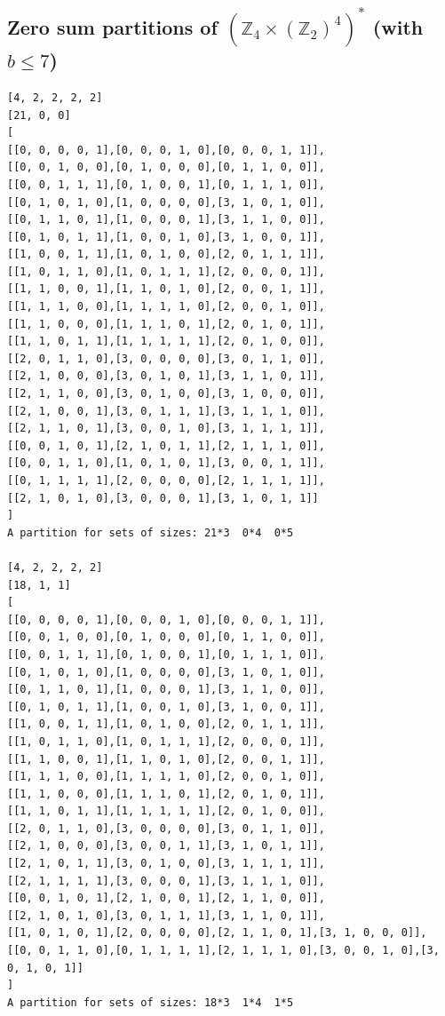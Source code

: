 \documentclass[final]{dmtcs-episciences}
\newcommand{\zet}{\mathbb{Z}}
\begin{document}
\begin{appendices}
\newpage
\section{\texorpdfstring{Zero sum partitions of $\left(\zet_4\times(\zet_2)^{4}\right)^*$ (with $b\leq 7$)}{Zero sum partitions of (Z4 x (Z2)**4)* (with b <= 7)}}\label{a:42222}

\begin{verbatim}
[4, 2, 2, 2, 2]
[21, 0, 0]
[
[[0, 0, 0, 0, 1],[0, 0, 0, 1, 0],[0, 0, 0, 1, 1]],
[[0, 0, 1, 0, 0],[0, 1, 0, 0, 0],[0, 1, 1, 0, 0]],
[[0, 0, 1, 1, 1],[0, 1, 0, 0, 1],[0, 1, 1, 1, 0]],
[[0, 1, 0, 1, 0],[1, 0, 0, 0, 0],[3, 1, 0, 1, 0]],
[[0, 1, 1, 0, 1],[1, 0, 0, 0, 1],[3, 1, 1, 0, 0]],
[[0, 1, 0, 1, 1],[1, 0, 0, 1, 0],[3, 1, 0, 0, 1]],
[[1, 0, 0, 1, 1],[1, 0, 1, 0, 0],[2, 0, 1, 1, 1]],
[[1, 0, 1, 1, 0],[1, 0, 1, 1, 1],[2, 0, 0, 0, 1]],
[[1, 1, 0, 0, 1],[1, 1, 0, 1, 0],[2, 0, 0, 1, 1]],
[[1, 1, 1, 0, 0],[1, 1, 1, 1, 0],[2, 0, 0, 1, 0]],
[[1, 1, 0, 0, 0],[1, 1, 1, 0, 1],[2, 0, 1, 0, 1]],
[[1, 1, 0, 1, 1],[1, 1, 1, 1, 1],[2, 0, 1, 0, 0]],
[[2, 0, 1, 1, 0],[3, 0, 0, 0, 0],[3, 0, 1, 1, 0]],
[[2, 1, 0, 0, 0],[3, 0, 1, 0, 1],[3, 1, 1, 0, 1]],
[[2, 1, 1, 0, 0],[3, 0, 1, 0, 0],[3, 1, 0, 0, 0]],
[[2, 1, 0, 0, 1],[3, 0, 1, 1, 1],[3, 1, 1, 1, 0]],
[[2, 1, 1, 0, 1],[3, 0, 0, 1, 0],[3, 1, 1, 1, 1]],
[[0, 0, 1, 0, 1],[2, 1, 0, 1, 1],[2, 1, 1, 1, 0]],
[[0, 0, 1, 1, 0],[1, 0, 1, 0, 1],[3, 0, 0, 1, 1]],
[[0, 1, 1, 1, 1],[2, 0, 0, 0, 0],[2, 1, 1, 1, 1]],
[[2, 1, 0, 1, 0],[3, 0, 0, 0, 1],[3, 1, 0, 1, 1]]
]
A partition for sets of sizes: 21*3  0*4  0*5

[4, 2, 2, 2, 2]
[18, 1, 1]
[
[[0, 0, 0, 0, 1],[0, 0, 0, 1, 0],[0, 0, 0, 1, 1]],
[[0, 0, 1, 0, 0],[0, 1, 0, 0, 0],[0, 1, 1, 0, 0]],
[[0, 0, 1, 1, 1],[0, 1, 0, 0, 1],[0, 1, 1, 1, 0]],
[[0, 1, 0, 1, 0],[1, 0, 0, 0, 0],[3, 1, 0, 1, 0]],
[[0, 1, 1, 0, 1],[1, 0, 0, 0, 1],[3, 1, 1, 0, 0]],
[[0, 1, 0, 1, 1],[1, 0, 0, 1, 0],[3, 1, 0, 0, 1]],
[[1, 0, 0, 1, 1],[1, 0, 1, 0, 0],[2, 0, 1, 1, 1]],
[[1, 0, 1, 1, 0],[1, 0, 1, 1, 1],[2, 0, 0, 0, 1]],
[[1, 1, 0, 0, 1],[1, 1, 0, 1, 0],[2, 0, 0, 1, 1]],
[[1, 1, 1, 0, 0],[1, 1, 1, 1, 0],[2, 0, 0, 1, 0]],
[[1, 1, 0, 0, 0],[1, 1, 1, 0, 1],[2, 0, 1, 0, 1]],
[[1, 1, 0, 1, 1],[1, 1, 1, 1, 1],[2, 0, 1, 0, 0]],
[[2, 0, 1, 1, 0],[3, 0, 0, 0, 0],[3, 0, 1, 1, 0]],
[[2, 1, 0, 0, 0],[3, 0, 0, 1, 1],[3, 1, 0, 1, 1]],
[[2, 1, 0, 1, 1],[3, 0, 1, 0, 0],[3, 1, 1, 1, 1]],
[[2, 1, 1, 1, 1],[3, 0, 0, 0, 1],[3, 1, 1, 1, 0]],
[[0, 0, 1, 0, 1],[2, 1, 0, 0, 1],[2, 1, 1, 0, 0]],
[[2, 1, 0, 1, 0],[3, 0, 1, 1, 1],[3, 1, 1, 0, 1]],
[[1, 0, 1, 0, 1],[2, 0, 0, 0, 0],[2, 1, 1, 0, 1],[3, 1, 0, 0, 0]],
[[0, 0, 1, 1, 0],[0, 1, 1, 1, 1],[2, 1, 1, 1, 0],[3, 0, 0, 1, 0],[3, 0, 1, 0, 1]]
]
A partition for sets of sizes: 18*3  1*4  1*5
\end{verbatim}


\end{appendices}
\end{document}
